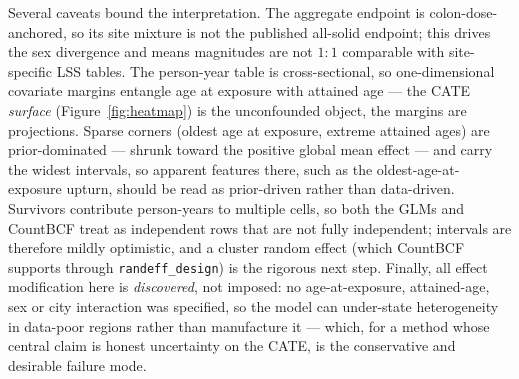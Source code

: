 \documentclass[11pt]{article}
\begin{document}
Several caveats bound the interpretation. The aggregate endpoint is
colon-dose-anchored, so its site mixture is not the published all-solid
endpoint; this drives the sex divergence and means magnitudes are not
$1{:}1$ comparable with site-specific LSS tables. The person-year table is
cross-sectional, so one-dimensional covariate margins entangle age at
exposure with attained age --- the CATE \emph{surface}
(Figure~\ref{fig:heatmap}) is the unconfounded object, the margins are
projections. Sparse corners (oldest age at exposure,
extreme attained ages) are prior-dominated --- shrunk toward the positive
global mean effect --- and carry the widest intervals, so apparent features
there, such as the oldest-age-at-exposure upturn, should be read as
prior-driven rather than data-driven.
Survivors contribute person-years to multiple cells, so both the GLMs and
CountBCF treat as independent rows that are not fully independent; intervals
are therefore mildly optimistic, and a cluster random effect (which CountBCF
supports through \texttt{randeff\_design}) is the rigorous next step.
Finally, all effect modification here is \emph{discovered}, not imposed: no
age-at-exposure, attained-age, sex or city interaction was specified, so the
model can under-state heterogeneity in data-poor regions rather than
manufacture it --- which, for a method whose central claim is honest
uncertainty on the CATE, is the conservative and desirable failure mode.
\end{document}
